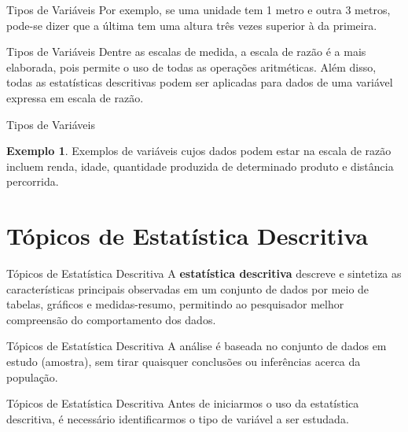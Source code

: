 \documentclass[10pt]{beamer}
\renewcommand{\indent}{\hspace*{2em}}
\theoremstyle{definition}
\newtheorem{ex}[defn]{\textcolor{strpink}{Exemplo}}
\begin{document}
\begin{frame}{Tipos de Variáveis}
\indent Por exemplo, se uma unidade tem 1 metro e outra 3 metros, pode-se dizer que a última tem uma altura três vezes superior à da primeira.
\end{frame}

\begin{frame}{Tipos de Variáveis}
\indent Dentre as escalas de medida, a escala de razão é a mais elaborada, pois permite o uso de todas as operações aritméticas. Além disso, todas as estatísticas descritivas podem ser aplicadas para dados de uma variável expressa em escala de razão.
\end{frame}

\begin{frame}{Tipos de Variáveis}
\begin{ex}
\vfill\indent Exemplos de variáveis cujos dados podem estar na escala de razão incluem renda, idade, quantidade produzida de determinado produto e distância percorrida.
\end{ex}
\end{frame}

\section{Tópicos de Estatística Descritiva}

\begin{frame}{Tópicos de Estatística Descritiva}
\indent A \textbf{estatística descritiva} descreve e sintetiza as características principais observadas em um conjunto de dados por meio de tabelas, gráficos e medidas-resumo, permitindo ao pesquisador melhor compreensão do comportamento dos dados.
\end{frame}

\begin{frame}{Tópicos de Estatística Descritiva}
\indent A análise é baseada no conjunto de dados em estudo (amostra), sem tirar quaisquer conclusões ou inferências acerca da população.
\end{frame}

\begin{frame}{Tópicos de Estatística Descritiva}
\indent Antes de iniciarmos o uso da estatística descritiva, é necessário identificarmos o tipo de variável a ser estudada.
\end{frame}
\end{document}
